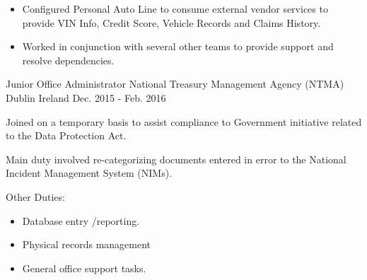 \begin{cventries}
{\begin{cvitems}
{\begin{itemize}
  		\item Configured Personal Auto Line to consume external vendor services to provide VIN Info, Credit Score, Vehicle 					Records and Claims History.  
  		\item Worked in conjunction with several other teams to provide support and resolve dependencies.
		\end{itemize}
		}
      \end{cvitems}	}
  \cventry
    {Junior Office Administrator} %
    {National Treasury Management Agency (NTMA)} %
    {Dublin Ireland} %
    {Dec. 2015 - Feb. 2016} %
    {
      \begin{cvitems} %
        \item {Joined on a temporary basis to assist compliance to Government initiative related to the Data Protection Act.}
        \item {Main duty involved re-categorizing documents entered in error to the National Incident Management System (NIMs).}
        \item {Other Duties:
        	\begin{itemize}
        		\item Database entry /reporting.
				\item Physical records management
				\item General office support tasks.
			\end{itemize}
			}
      \end{cvitems}
    }
\end{cventries}
